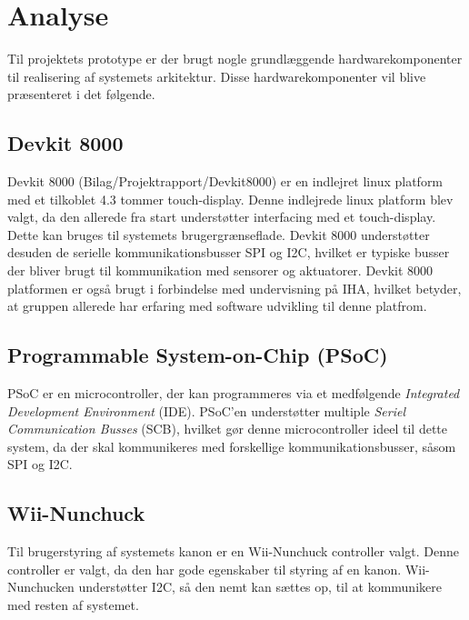 \chapter{Analyse}
\label{afsnit:analyse}
Til projektets prototype er der brugt nogle grundlæggende hardwarekomponenter til realisering af systemets arkitektur. Disse hardwarekomponenter vil blive præsenteret i det følgende.

\section{Devkit 8000}
Devkit 8000 (Bilag/Projektrapport/Devkit8000) er en indlejret linux platform med et tilkoblet 4.3 tommer touch-display. Denne indlejrede linux platform blev valgt, da den allerede fra start understøtter interfacing med et touch-display. Dette kan bruges til systemets brugergrænseflade. Devkit 8000 understøtter desuden de serielle kommunikationsbusser SPI og I2C, hvilket er typiske busser der bliver brugt til kommunikation med sensorer og aktuatorer. \newline 
\noindent Devkit 8000 platformen er også brugt i forbindelse med undervisning på IHA, hvilket betyder, at gruppen allerede har erfaring med software udvikling til denne platfrom.

\section{Programmable System-on-Chip (PSoC)}
PSoC \cite{psoc} er en microcontroller, der kan programmeres via et medfølgende \textit{Integrated Development Environment} (IDE). PSoC'en understøtter multiple \textit{Seriel Communication Busses} (SCB), hvilket gør denne microcontroller ideel til dette system, da der skal kommunikeres med forskellige kommunikationsbusser, såsom SPI og I2C.

\section{Wii-Nunchuck}
Til brugerstyring af systemets kanon er en Wii-Nunchuck controller \cite{nunchuck} valgt. Denne controller er valgt, da den har gode egenskaber til styring af en kanon. Wii-Nunchucken understøtter I2C, så den nemt kan sættes op, til at kommunikere med resten af systemet.

